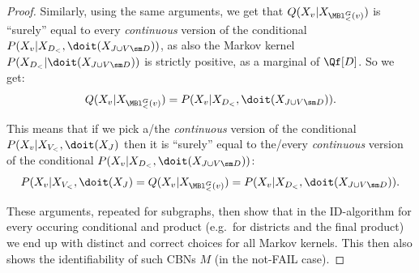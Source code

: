 \begin{Thm}
\begin{proof}
     Similarly, using the same arguments, we get that $Q(X_v|X_{\MBl^G_<(v)})$ is ``surely'' equal to every \emph{continuous} version 
     of the conditional
     $P(X_v|X_{D_<},\doit(X_{J \cup V\sm D}))$, as also the Markov kernel $P(X_{D_<}|\doit(X_{J \cup V\sm D}))$ is strictly positive,
     as a marginal of $\Qf[D]$. So we get:
     \[ Q(X_v|X_{\MBl^G_<(v)}) = P(X_v|X_{D_<},\doit(X_{J \cup V\sm D})).  \]

     This means that if we pick a/the \emph{continuous} version of the conditional $P(X_v|X_{V_<},\doit(X_J)$ 
     then it is ``surely'' equal to
     the/every \emph{continuous} version of the conditional $P(X_v|X_{D_<},\doit(X_{J \cup V\sm D}))$:
     \[ P(X_v|X_{V_<},\doit(X_J)=Q(X_v|X_{\MBl^G_<(v)}) = P(X_v|X_{D_<},\doit(X_{J \cup V\sm D})).  \]

     These arguments, repeated for subgraphs, then show that in the ID-algorithm for every occuring conditional and product
     (e.g.\ for districts and the final product) we end up with 
     distinct and correct choices for all Markov kernels. This then also shows the identifiability of such CBNs $M$
     (in the not-FAIL case).
    \end{proof}
\end{Thm}


